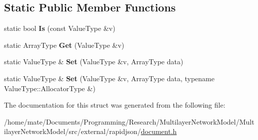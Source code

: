 \subsection*{Static Public Member Functions}
\begin{DoxyCompactItemize}
\item 
static bool {\bfseries Is} (const Value\+Type \&v)\hypertarget{structinternal_1_1TypeHelper_3_01ValueType_00_01typename_01ValueType_1_1Array_01_4_a2a052fc0139112075f8bade42964273d}{}\label{structinternal_1_1TypeHelper_3_01ValueType_00_01typename_01ValueType_1_1Array_01_4_a2a052fc0139112075f8bade42964273d}

\item 
static Array\+Type {\bfseries Get} (Value\+Type \&v)\hypertarget{structinternal_1_1TypeHelper_3_01ValueType_00_01typename_01ValueType_1_1Array_01_4_a0e6bd47ab5da0387bf419cdf644035ab}{}\label{structinternal_1_1TypeHelper_3_01ValueType_00_01typename_01ValueType_1_1Array_01_4_a0e6bd47ab5da0387bf419cdf644035ab}

\item 
static Value\+Type \& {\bfseries Set} (Value\+Type \&v, Array\+Type data)\hypertarget{structinternal_1_1TypeHelper_3_01ValueType_00_01typename_01ValueType_1_1Array_01_4_a7bab3fa93fb8bda16baf289e1d281315}{}\label{structinternal_1_1TypeHelper_3_01ValueType_00_01typename_01ValueType_1_1Array_01_4_a7bab3fa93fb8bda16baf289e1d281315}

\item 
static Value\+Type \& {\bfseries Set} (Value\+Type \&v, Array\+Type data, typename Value\+Type\+::\+Allocator\+Type \&)\hypertarget{structinternal_1_1TypeHelper_3_01ValueType_00_01typename_01ValueType_1_1Array_01_4_adba46e8947dcfecaeca5a5a5d8bb36cc}{}\label{structinternal_1_1TypeHelper_3_01ValueType_00_01typename_01ValueType_1_1Array_01_4_adba46e8947dcfecaeca5a5a5d8bb36cc}

\end{DoxyCompactItemize}


The documentation for this struct was generated from the following file\+:\begin{DoxyCompactItemize}
\item 
/home/mate/\+Documents/\+Programming/\+Research/\+Multilayer\+Network\+Model/\+Multilayer\+Network\+Model/src/external/rapidjson/\hyperlink{document_8h}{document.\+h}\end{DoxyCompactItemize}
